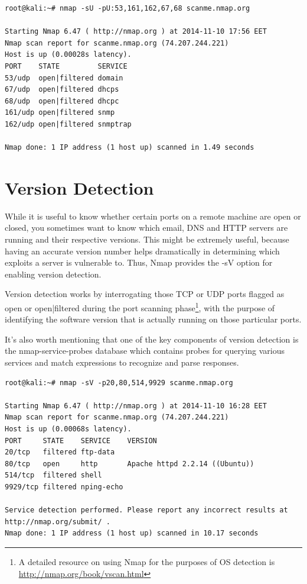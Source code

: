 \documentclass[a4paper,oneside,12pt]{book}
\begin{document}
\begin{lstlisting}[title=A sample Nmap scan using the UDP Scan option]
root@kali:~# nmap -sU -pU:53,161,162,67,68 scanme.nmap.org

Starting Nmap 6.47 ( http://nmap.org ) at 2014-11-10 17:56 EET
Nmap scan report for scanme.nmap.org (74.207.244.221)
Host is up (0.00028s latency).
PORT    STATE         SERVICE
53/udp  open|filtered domain
67/udp  open|filtered dhcps
68/udp  open|filtered dhcpc
161/udp open|filtered snmp
162/udp open|filtered snmptrap

Nmap done: 1 IP address (1 host up) scanned in 1.49 seconds
\end{lstlisting}

\chapter{Version Detection}

While it is useful to know whether certain ports on a remote machine are open or closed, you sometimes want to know which email, DNS and HTTP servers are running and their respective versions. This might be extremely useful, because having an accurate version number helps dramatically in determining which exploits a server is vulnerable to. Thus, Nmap provides the -sV option for enabling version detection.

Version detection works by interrogating those TCP or UDP ports flagged as open or open|filtered during the port scanning phase\footnote{A detailed resource on using Nmap for the purposes of OS detection is \url{http://nmap.org/book/vscan.html}}, with the purpose of identifying the software version that is actually running on those particular ports.

It's also worth mentioning that one of the key components of version detection is the nmap-service-probes database which contains probes for querying various services and match expressions to recognize and parse responses.

\begin{lstlisting}[title=A sample Nmap scan using the Version Detection option]
root@kali:~# nmap -sV -p20,80,514,9929 scanme.nmap.org

Starting Nmap 6.47 ( http://nmap.org ) at 2014-11-10 16:28 EET
Nmap scan report for scanme.nmap.org (74.207.244.221)
Host is up (0.00068s latency).
PORT     STATE    SERVICE    VERSION
20/tcp   filtered ftp-data
80/tcp   open     http       Apache httpd 2.2.14 ((Ubuntu))
514/tcp  filtered shell
9929/tcp filtered nping-echo

Service detection performed. Please report any incorrect results at http://nmap.org/submit/ .
Nmap done: 1 IP address (1 host up) scanned in 10.17 seconds
\end{lstlisting}
\end{document}
